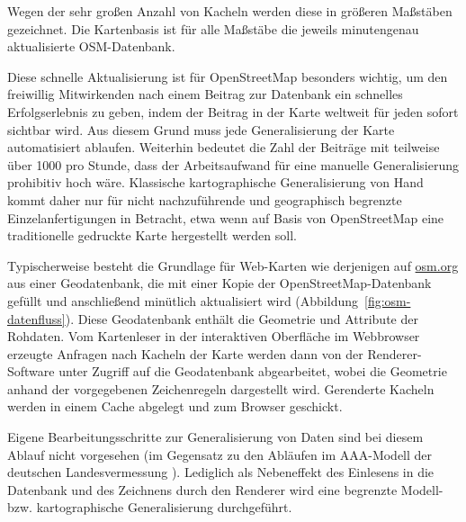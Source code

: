 \documentclass[../main/thesis.tex]{subfiles}
\begin{document}
Wegen der sehr großen Anzahl von Kacheln werden diese in größeren Maßstäben  gezeichnet. 
Die Kartenbasis ist für alle Maßstäbe die jeweils minutengenau aktualisierte OSM-Datenbank.

Diese schnelle Aktualisierung ist für OpenStreetMap besonders wichtig, um den freiwillig Mitwirkenden nach einem Beitrag zur Datenbank ein schnelles Erfolgserlebnis zu geben, indem der Beitrag in der Karte weltweit für jeden sofort sichtbar wird.
Aus diesem Grund muss jede Generalisierung der Karte automatisiert ablaufen.
Weiterhin bedeutet die Zahl der Beiträge mit teilweise über 1000  pro Stunde, 
dass der Arbeitsaufwand für eine manuelle Generalisierung prohibitiv hoch wäre.
Klassische kartographische Generalisierung von Hand kommt daher nur für nicht nachzuführende und geographisch begrenzte Einzelanfertigungen in Betracht, etwa wenn auf Basis von OpenStreetMap eine traditionelle gedruckte Karte hergestellt werden soll.

Typischerweise besteht die Grundlage für Web-Karten wie derjenigen auf \url{osm.org} aus einer Geodatenbank, die mit einer Kopie der OpenStreetMap-Datenbank gefüllt und anschließend minütlich aktualisiert wird (Abbildung~\ref{fig:osm-datenfluss}).
Diese Geodatenbank enthält die Geometrie und Attribute  der Rohdaten.
Vom Kartenleser in der interaktiven Oberfläche im Webbrowser erzeugte Anfragen nach Kacheln der Karte werden dann von der Renderer-Software unter Zugriff auf die Geodatenbank abgearbeitet, wobei die Geometrie anhand der vorgegebenen Zeichenregeln dargestellt wird.
Gerenderte Kacheln werden in einem Cache abgelegt und zum Browser geschickt.

Eigene Bearbeitungsschritte zur Generalisierung von Daten sind bei diesem Ablauf nicht vorgesehen (im Gegensatz zu den Abläufen im AAA-Modell der deutschen Landesvermessung ).
Lediglich als Nebeneffekt des Einlesens in die Datenbank und des Zeichnens durch den Renderer wird eine begrenzte Modell- bzw. kartographische Generalisierung durchgeführt. 
\end{document}

